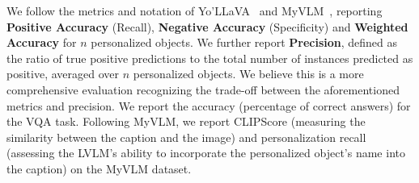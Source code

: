  We follow the metrics and notation of Yo’LLaVA~\cite{nguyen2024yo} and MyVLM~\cite{alaluf2024myvlm}, reporting \textbf{Positive Accuracy} (Recall), \textbf{Negative Accuracy} (Specificity) and \textbf{Weighted Accuracy} for $n$ personalized objects.  We further report \textbf{Precision}, defined as the ratio of true positive predictions to the total number of instances predicted as positive, averaged over $n$ personalized objects. We believe this is a more comprehensive evaluation recognizing the trade-off between the aforementioned metrics and precision. %
We report the accuracy (percentage of correct answers) for the VQA task. Following MyVLM, we  report CLIPScore (measuring the similarity between the caption and the image) and personalization recall (assessing the LVLM's ability to incorporate the personalized object's name into the caption) on the MyVLM dataset.

